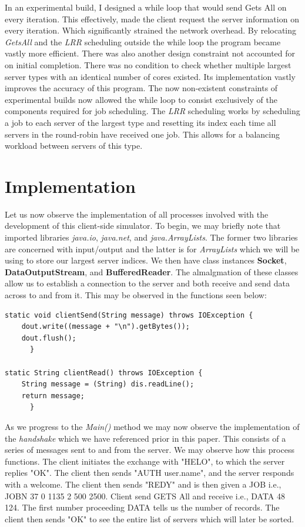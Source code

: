 \documentclass{article}
\begin{document}
 In an experimental build, I designed a while loop that would send Gets All on every iteration. This effectively, made the client request the server information on every iteration. Which significantly strained the network overhead. By relocating \emph{GetsAll} and the \emph{LRR} scheduling outside the while loop the program became vastly more efficient. There was also another design constraint not accounted for on initial completion. There was no condition to check whether multiple largest server types with an identical number of cores existed. Its implementation vastly improves the accuracy of this program. The now non-existent constraints of experimental builds now allowed the while loop to consist exclusively of the components required for job scheduling. The \emph{LRR} scheduling works by scheduling a job to each server of the largest type and resetting its index each time all servers in the round-robin have received one job. This allows for a balancing workload between servers of this type.
  
\section{Implementation }
Let us now observe the implementation of all processes involved with the development of this client-side simulator. To begin, we may briefly note that imported libraries \emph{java.io}, \emph{java.net}, and \emph{java.ArrayLists}. The former two libraries are concerned with input/output and the latter is for \emph{ArrayLists} which we will be using to store our largest server indices. We then have class instances \textbf{Socket}, \textbf{DataOutputStream}, and \textbf{BufferedReader}. The almalgmation of these classes allow us to establish a connection to the server and both receive and send data across to and from it. This may be observed in the functions seen below:
\begin{lstlisting}
static void clientSend(String message) throws IOException {
    dout.write((message + "\n").getBytes());
    dout.flush();
      }
    
static String clientRead() throws IOException {
    String message = (String) dis.readLine();
    return message;
      }
\end{lstlisting}
As we progress to the \emph{Main()} method we may now observe the implementation of the \emph{handshake} which we have referenced prior in this paper. This consists of a series of messages sent to and from the server. We may observe how this process functions. The client initiates the exchange with "HELO", to which the server replies "OK". The client then sends "AUTH user.name", and the server responds with a welcome. The client then sends "REDY" and is then given a JOB i.e., JOBN 37 0 1135 2 500 2500. Client send GETS All and receive i.e., DATA 48 124. The first number proceeding DATA tells us the number of records. The client then sends "OK" to see the entire list of servers which will later be sorted.\newline
\end{document}
